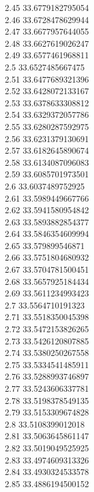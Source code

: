 {2.45	33.6779182795054\\
2.46	33.6728478629944\\
2.47	33.6677957644055\\
2.48	33.6627619026247\\
2.49	33.6577461968811\\
2.5	33.6527485667475\\
2.51	33.6477689321396\\
2.52	33.6428072133167\\
2.53	33.6378633308812\\
2.54	33.6329372057786\\
2.55	33.6280287592975\\
2.56	33.6231379130691\\
2.57	33.6182645890674\\
2.58	33.6134087096083\\
2.59	33.6085701973501\\
2.6	33.6037489752925\\
2.61	33.5989449667766\\
2.62	33.5941580954842\\
2.63	33.5893882854377\\
2.64	33.5846354609994\\
2.65	33.579899546871\\
2.66	33.5751804680932\\
2.67	33.5704781500451\\
2.68	33.5657925184434\\
2.69	33.5611234993423\\
2.7	33.5564710191323\\
2.71	33.5518350045398\\
2.72	33.5472153826265\\
2.73	33.5426120807885\\
2.74	33.5380250267558\\
2.75	33.5334541485911\\
2.76	33.5288993746897\\
2.77	33.5243606337781\\
2.78	33.5198378549135\\
2.79	33.5153309674828\\
2.8	33.5108399012018\\
2.81	33.5063645861147\\
2.82	33.5019049525925\\
2.83	33.4974609313326\\
2.84	33.4930324533578\\
2.85	33.4886194500152\\
}
